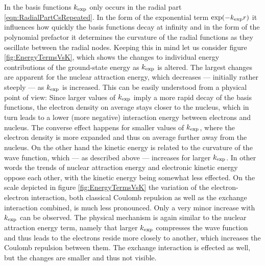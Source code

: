 In the \CS basis functions
$k_\text{exp}$ only occurs in the radial part \eqref{eqn:RadialPartCsRepeated}.
In the form of the exponential term $\exp(-k_\text{exp} r)$
it influences how quickly the basis functions decay at infinity
and in the form of the polynomial prefactor it determines
the curvature of the radial functions as they oscillate between the radial nodes.
Keeping this in mind let us consider figure \vref{fig:EnergyTermsVsK},
which shows the changes to individual energy contributions
of the \HF ground-state energy as $k_\text{exp}$ is altered.
The largest changes are apparent for the nuclear attraction energy,
which decreases --- initially rather steeply --- as $k_\text{exp}$ is increased.
This can be easily understood from a physical point of view:
Since larger values of $k_\text{exp}$ imply a more rapid decay
of the basis functions,
the electron density on average stays closer to the nucleus,
which in turn leads to a lower (more negative) interaction energy
between electrons and nucleus.
The converse effect happens for smaller values of $k_\text{exp}$,
where the electron density is more expanded
and thus on average further away from the nucleus.
On the other hand the kinetic energy is related to the curvature of the wave function,
which --- as described above --- increases for larger $k_\text{exp}$.
In other words the trends of nuclear attraction energy and electronic kinetic energy
oppose each other,
with the kinetic energy being somewhat less effected.
On the scale depicted in figure \ref{fig:EnergyTermsVsK}
the variation of the electron-electron interaction,
\ie both classical Coulomb repulsion as well as the exchange interaction combined,
is much less pronounced.
Only a very minor increase with $k_\text{exp}$ can be observed.
The physical mechanism is again similar to the nuclear attraction
energy term,
namely that larger $k_\text{exp}$ compresses the wave function
and thus leads to the electrons reside more closely to another,
which increases the Coulomb repulsion between them.
The exchange interaction is effected as well,
but the changes are smaller and thus not visible.

